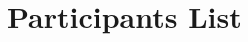 \documentclass[twoside]{article}
\begin{document}
\section*{\sf\Large Participants List}

 \begin{multicols*}{3}
 \small
    
\end{multicols*}
\end{document}
